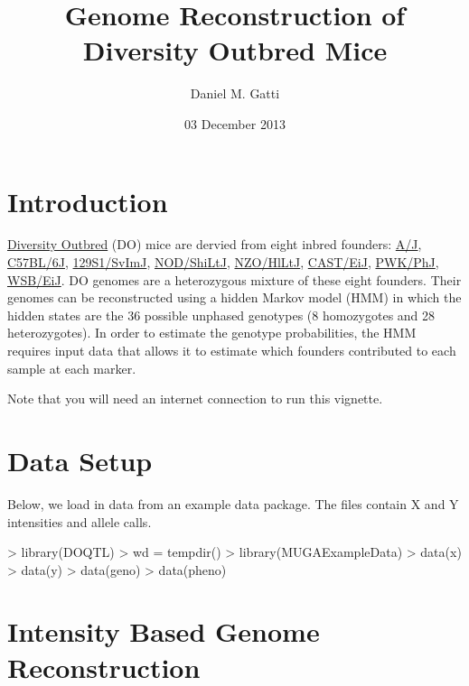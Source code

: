 \documentclass{article}
\begin{document}


\title{Genome Reconstruction of Diversity Outbred Mice}
\author{Daniel M. Gatti}
\date{03 December 2013}
\maketitle

\section{Introduction}

\href{http://jaxmice.jax.org/strain/009376.html}{Diversity Outbred} (DO) mice are dervied from eight inbred founders: 
  \href{http://jaxmice.jax.org/strain/000646.html}{A/J},
  \href{http://jaxmice.jax.org/strain/000664.html}{C57BL/6J},
  \href{http://jaxmice.jax.org/strain/002448.html}{129S1/SvImJ},
  \href{http://jaxmice.jax.org/strain/001976.html}{NOD/ShiLtJ},
  \href{http://jaxmice.jax.org/strain/002105.html}{NZO/HlLtJ},
  \href{http://jaxmice.jax.org/strain/000928.html}{CAST/EiJ},
  \href{http://jaxmice.jax.org/strain/003715.html}{PWK/PhJ},
  \href{http://jaxmice.jax.org/strain/001145.html}{WSB/EiJ}.
DO genomes are a heterozygous mixture of these eight founders. Their genomes can be 
reconstructed using a hidden Markov model (HMM) in which the hidden states are the 36 possible 
unphased genotypes (8 homozygotes and 28 heterozygotes).  In order to estimate the genotype
probabilities, the HMM requires input data that allows it to estimate which founders contributed
to each sample at each marker.

Note that you will need an internet connection to run this vignette.

\section{Data Setup}

Below, we load in data from an example data package. The files contain X and Y intensities and allele calls.

\begin{Schunk}
\begin{Sinput}
> library(DOQTL)
> wd = tempdir()
> library(MUGAExampleData)
> data(x)
> data(y)
> data(geno)
> data(pheno)
\end{Sinput}
\end{Schunk}

\section{Intensity Based Genome Reconstruction}
\end{document}
